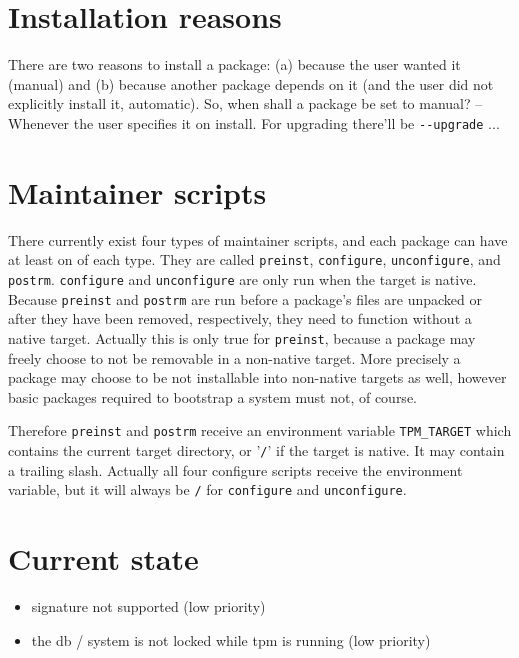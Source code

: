 \documentclass[a4paper]{scrartcl}
\newcommand{\script}[1]{\texttt{#1}}
\begin{document}
	\section{Installation reasons}
	\label{sec:installation_reasons}
	
	There are two reasons to install a package: (a) because the user wanted it (manual) and (b) because another package depends on it (and the user did not explicitly install it, automatic). So, when shall a package be set to manual? -- Whenever the user specifies it on install. For upgrading there'll be \texttt{-{}-upgrade} ...
	
	
	\section{Maintainer scripts}
	\label{sec:maintainer_scripts}
	
	There currently exist four types of maintainer scripts, and each package can have at least on of each type. They are called \script{preinst}, \script{configure}, \script{unconfigure}, and \script{postrm}. \script{configure} and \script{unconfigure} are only run when the target is native. Because \script{preinst} and \script{postrm} are run before a package's files are unpacked or after they have been removed, respectively, they need to function without a native target. Actually this is only true for \script{preinst}, because a package may freely choose to not be removable in a non-native target. More precisely a package may choose to be not installable into non-native targets as well, however basic packages required to bootstrap a system must not, of course.
	
	Therefore \script{preinst} and \script{postrm} receive an environment variable \texttt{TPM\_TARGET} which contains the current target directory, or '\texttt{/}' if the target is native. It may contain a trailing slash. Actually all four configure scripts receive the environment variable, but it will always be \texttt{/} for \script{configure} and \script{unconfigure}.






	\section{Current state}
	\label{sec:current_state}
	
	\begin{itemize}
		\item signature not supported (low priority)
		\item the db / system is not locked while tpm is running (low priority)
	\end{itemize}
	
\end{document}

